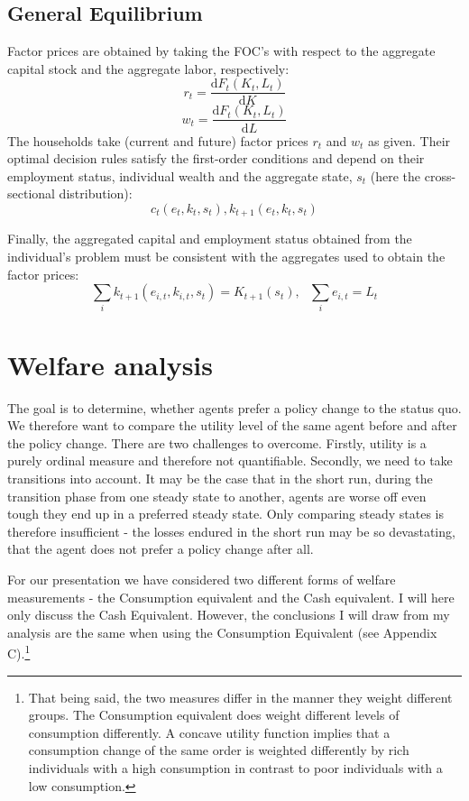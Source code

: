 \documentclass[a4paper,11pt]{article}
\begin{document}
\subsection{General Equilibrium}

Factor prices are obtained by taking the FOC's with respect to the aggregate capital stock and the aggregate labor, respectively: 
\begin{equation}
  \label{eq:interestrate}
r_{t} = \frac{\mathrm d F_{t}(K_{t},L_{t})}{\mathrm d K} 
\end{equation}
\begin{equation}
  \label{eq:wage}
w_{t} = \frac{\mathrm d F_{t}(K_{t},L_{t})}{\mathrm d L} 
\end{equation}
The households take (current and future) factor prices $r_{t}$ and $w_{t}$ as given. Their optimal decision rules satisfy the first-order conditions and depend on their employment status, individual wealth and the aggregate state, $s_{t}$ (here the cross-sectional distribution): 
\[ c_{t}(e_{t},k_{t},s_{t}), k_{t+1}(e_{t},k_{t},s_{t})
\]

Finally, the aggregated capital and employment status obtained from the individual's problem must be consistent with the aggregates used to obtain the factor prices: 
\[ \sum_{i}k_{t+1}(e_{i,t},k_{i,t},s_{t})=K_{t+1}(s_{t}), \ \ \ \sum_{i}e_{i,t}=L_{t} 
\]

\section{Welfare analysis}
The goal is to determine, whether agents prefer a policy change to the status quo. We therefore want to compare the utility level of the same agent before and after the policy change. There are two challenges to overcome. Firstly, utility is a purely ordinal measure and therefore not quantifiable. Secondly, we need to take transitions into account. It may be the case that in the short run, during the transition phase from one steady state to another, agents are worse off even tough they end up in a preferred steady state. Only comparing steady states is therefore insufficient - the losses endured in the short run may be so devastating, that the agent does not prefer a policy change after all. 

For our presentation we have considered two different forms of welfare measurements - the Consumption equivalent and the Cash equivalent. I will here only discuss the Cash Equivalent. However, the conclusions I will draw from my analysis are the same when using the Consumption Equivalent (see Appendix C).\footnote{That being said, the two measures differ in the manner they weight different groups. The Consumption equivalent does weight different levels of consumption differently. A concave utility function implies that a consumption change of the same order is weighted differently by rich individuals with a high consumption in contrast to poor individuals with a low consumption.} 
\end{document}
